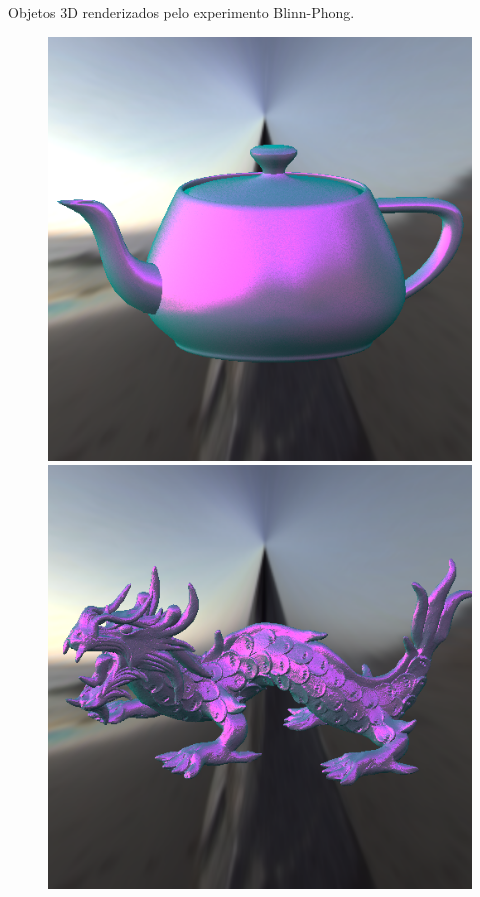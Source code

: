 \begin{frame}{Objetos 3D renderizados pelo experimento Blinn-Phong.}
\begin{figure}[H]
    \label{fig-blinn-phong-eqlang}
  \includegraphics[width=\linewidth]{./Imagens/brdfs/blinn-phong-teapot.png}
\endminipage\hfill
{}
  \includegraphics[width=\linewidth]{./Imagens/brdfs/blinn-phong-dragon.png}

\end{figure}
\end{frame}
